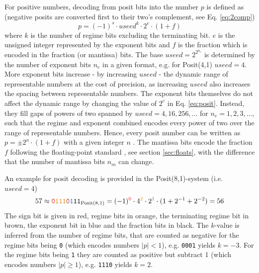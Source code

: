 For positive numbers, decoding from posit bits into the number $p$ is defined as
\citep{Gustafson2017a,Klower2019a,Chen2018} (negative posits are converted first to their two's complement, see
Eq. \ref{eq:2comp})
\begin{equation}
p = (-1)^s \cdot useed^k \cdot 2^e \cdot (1+f)
\label{eq:posit}
\end{equation}
where $k$ is the number of regime bits excluding the terminating bit. $e$ is the unsigned integer represented by the
exponent bits and $f$ is the fraction which is encoded in the fraction (or mantissa) bits. The base $useed = 2^{2^{n_e}}$ is
determined by the number of exponent bits $n_e$ in a given format, e.g. for Posit(4,1) $useed = 4$. More exponent bits
increase - by increasing $useed$ - the dynamic range of representable numbers at the cost of precision,
as increasing $useed$ also increases the spacing between representable numbers. The exponent bits themselves do
not affect the dynamic range by changing the value of $2^e$ in Eq. \ref{eq:posit}. Instead, they fill gaps of
powers of two spanned by $useed = 4,16,256,...$ for $n_e=1,2,3,...$, such that the regime and exponent combined
encodes every power of two over the range of representable numbers. Hence, every posit number can be written as
$p = \pm 2^n \cdot (1+f)$ with a given integer $n$ \citep{Gustafson2017a,Chen2018}. The mantissa bits encode the
fraction $f$ following the floating-point standard \citep{IEEE1985}, see section \ref{sec:floats}, with the difference that
the number of mantissa bits $n_m$ can change.

An example for posit decoding is provided in the Posit(8,1)-system (i.e. $useed = 4$)
\begin{equation}
57 \approx \mathtt{{\color{psign}0}{\color{pregime}111}{\color{pregimet}0}{\color{pexpo}1}11}_{\op{Posit}(8,1)} = (-1)^{\color{psign}0}
\cdot 4^{\color{pregime}2} \cdot 2^{\color{pexpo}1} \cdot (1+2^{-1}+2^{-2}) = 56
\label{eq:posit_pos}
\end{equation}
The sign bit is given in red, regime bits in orange, the terminating regime bit in brown, the exponent bit in blue and the fraction bits in black.
The $k$-value is inferred from the number of regime bits, that are counted as negative for the regime bits being \texttt{0}
(which encodes numbers $\vert p \vert <1$), e.g. \texttt{{\color{pregime}000}{\color{pregimet}1}} yields $k=-3$. For the regime bits being \texttt{1}
they are counted as positive but subtract 1 (which encodes numbers $\vert p \vert \geq 1$), e.g. \texttt{{\color{pregime}111}{\color{pregimet}0}}
yields $k=2$.

